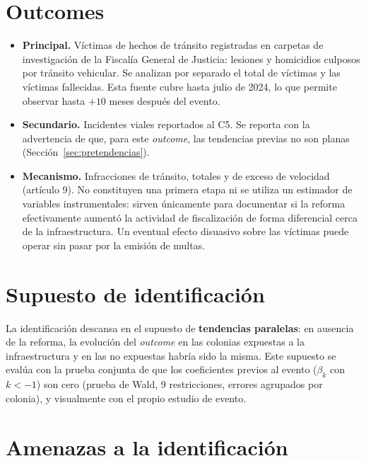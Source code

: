 \section{Outcomes}
\label{sec:estrategia_outcomes}

\begin{itemize}
  \item \textbf{Principal.} Víctimas de hechos de tránsito registradas en
        carpetas de investigación de la Fiscalía General de Justicia: lesiones y
        homicidios culposos por tránsito vehicular. Se analizan por separado el
        total de víctimas y las víctimas fallecidas. Esta fuente cubre hasta
        julio de 2024, lo que permite observar hasta $+10$ meses después del
        evento.
  \item \textbf{Secundario.} Incidentes viales reportados al C5. Se reporta con
        la advertencia de que, para este \emph{outcome}, las tendencias previas
        no son planas (Sección~\ref{sec:pretendencias}).
  \item \textbf{Mecanismo.} Infracciones de tránsito, totales y de exceso de
        velocidad (artículo 9). No constituyen una primera etapa ni se utiliza
        un estimador de variables instrumentales: sirven únicamente para
        documentar si la reforma efectivamente aumentó la actividad de
        fiscalización de forma diferencial cerca de la infraestructura. Un
        eventual efecto disuasivo sobre las víctimas puede operar sin pasar por
        la emisión de multas.
\end{itemize}

\section{Supuesto de identificación}

La identificación descansa en el supuesto de \textbf{tendencias paralelas}: en
ausencia de la reforma, la evolución del \emph{outcome} en las colonias
expuestas a la infraestructura y en las no expuestas habría sido la misma. Este
supuesto se evalúa con la prueba conjunta de que los coeficientes previos al
evento ($\beta_k$ con $k < -1$) son cero (prueba de Wald, 9 restricciones,
errores agrupados por colonia), y visualmente con el propio estudio de evento.

\section{Amenazas a la identificación}


